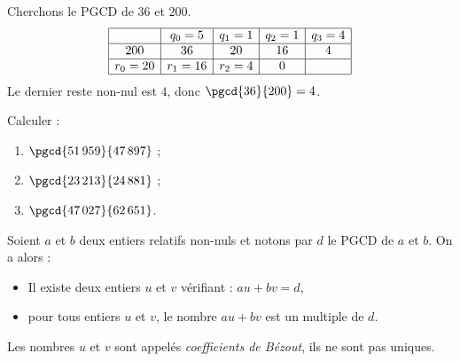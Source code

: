             \begin{ex}
            \label{ex:Algorithme d'Euclide: 36,200}
                  Cherchons le PGCD de $36$ et $200$.
                  \[
                  \begin{array}{|c|c|c|c|c|}
                  \hline 
                           & q_0 = 5  & q_1 = 1   & q_2 = 1 & q_3 = 4 \\ 
                  \hline 
                  200      &      36  &      20   &      16 &       4 \\ 
                  \hline 
                  r_0 = 20 & r_1 = 16 & r_2 = 4   &       0 &         \\ 
                  \hline 
                  \end{array} 
                  \]
                  Le dernier reste non-nul est $4$, donc $\pgcd{36}{200} = 4$.
            \end{ex}
            \begin{exe}\label{exe:arith-6}
                  Calculer :
                  \begin{enumerate}[label=\alph*)]
                        \item $\pgcd{51\,959}{47\,897}$ ;
                        \item $\pgcd{23\,213}{24\,881}$ ;
                        \item $\pgcd{47\,027}{62\,651}$.
                  \end{enumerate}
            \end{exe}
            \begin{thm}
                  Soient $a$ et $b$ deux entiers relatifs non-nuls et notons par $d$ le PGCD de $a$ et $b$.
                  On a alors :
                  \begin{itemize}
                        \item Il existe deux entiers $u$ et $v$ v\'erifiant : $a u + b v = d$,
                        \item pour tous entiers $u$ et $v$, le nombre $a u + b v$ est un multiple de $d$.
                  \end{itemize}
                  Les nombres $u$ et $v$ sont appel\'es \emph{coefficients de B\'ezout},
                  ils ne sont pas uniques.
            \end{thm}
